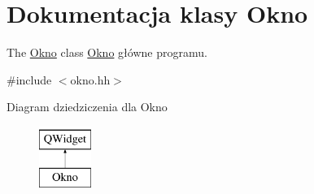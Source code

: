 \hypertarget{class_okno}{\section{Dokumentacja klasy Okno}
\label{class_okno}
}


The \hyperlink{class_okno}{Okno} class \hyperlink{class_okno}{Okno} główne programu.  




{\ttfamily \#include $<$okno.\-hh$>$}

Diagram dziedziczenia dla Okno\begin{figure}[H]
\begin{center}
\leavevmode
\includegraphics[height=2.000000cm]{class_okno}
\end{center}
\end{figure}
